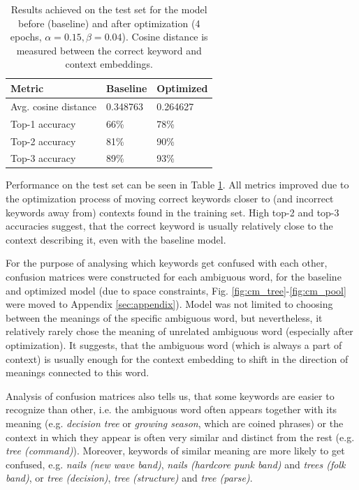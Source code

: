 \documentclass{llncs}
\begin{document}
\begin{table}
\centering
\begin{tabular}{ | m{3cm} | m{2cm} | m{2cm} |}
    \hline
    \textbf{Metric} & \textbf{Baseline} & \textbf{Optimized} \\
    \hline
    Avg. cosine distance & 0.348763 & 0.264627 \\
    \hline
    Top-1 accuracy & 66\% & 78\% \\
    \hline
    Top-2 accuracy & 81\% & 90\% \\
    \hline
    Top-3 accuracy & 89\% & 93\% \\
    \hline
\end{tabular}
\caption{Results achieved on the test set for the model before (baseline) and after optimization (4 epochs, \(\alpha=0.15, \beta=0.04\)). Cosine distance is measured between the correct keyword and context embeddings.}
\label{table:model_analysis}
\end{table}

Performance on the test set can be seen in Table \ref{table:model_analysis}.
All metrics improved due to the optimization process of moving correct keywords closer to (and incorrect keywords away from) contexts found in the training set.
High top-2 and top-3 accuracies suggest, that the correct keyword is usually relatively close to the context describing it, even with the baseline model.

For the purpose of analysing which keywords get confused with each other, confusion matrices were constructed for each ambiguous word, for the baseline and optimized model (due to space constraints, Fig. \ref{fig:cm_tree}-\ref{fig:cm_pool} were moved to Appendix \ref{sec:appendix}).
Model was not limited to choosing between the meanings of the specific ambiguous word, but nevertheless, it relatively rarely chose the meaning of unrelated ambiguous word (especially after optimization).
It suggests, that the ambiguous word (which is always a part of context) is usually enough for the context embedding to shift in the direction of meanings connected to this word.

Analysis of confusion matrices also tells us, that some keywords are easier to recognize than other, i.e. the ambiguous word often appears together with its meaning (e.g. \textit{decision tree} or \textit{growing season}, which are coined phrases) or the context in which they appear is often very similar and distinct from the rest (e.g. \textit{tree (command)}).
Moreover, keywords of similar meaning are more likely to get confused, e.g. \textit{nails (new wave band)}, \textit{nails (hardcore punk band)} and \textit{trees (folk band)}, or \textit{tree (decision)}, \textit{tree (structure)} and \textit{tree (parse)}.
\end{document}
